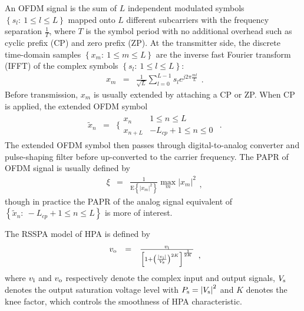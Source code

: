 \documentclass[conference]{IEEEtran}
\begin{document}
An OFDM signal is the sum of $L$ independent modulated symbols
$\left\{s_{l}:\ 1\leq l\leq L\right\}$ mapped onto $L$ different
subcarriers with the frequency separation $\frac{1}{T}$, where $T$
is the symbol period with no additional overhead such as cyclic
prefix (CP) and zero prefix (ZP). At the transmitter side, the
discrete time-domain samples $\left\{x_{m}:\ 1\leq m\leq
L\right\}$ are the inverse fast Fourier transform (IFFT) of the
complex symbols $\left\{s_{l}:\ 1\leq l\leq L\right\}$:
\begin{equation}
\begin{array}{lcl}
x_{m}&=&\frac{1}{\sqrt{L}}\sum\limits_{l=0}^{L-1}s_{l}e^{j2\pi\frac{ml}{L}}
\end{array}.\label{OFDM}
\end{equation}
\noindent Before transmission, $x_{m}$ is usually extended by
attaching a CP or ZP. When CP is applied, the extended OFDM symbol
\begin{equation}
\begin{array}{rcl}
\tilde{x}_{n}&=&\Bigg\{ \begin{array}{ll}x_{n}&1\leq n\leq L\\
x_{n+L}&-L_{cp}+1\leq n\leq 0 \end{array}
\end{array}.
\end{equation}
\noindent The extended OFDM symbol then passes through
digital-to-analog converter and pulse-shaping filter before
up-converted to the carrier frequency. The PAPR of OFDM signal is
usually defined by
\begin{equation}
\begin{array}{rcl}
\xi&=&\frac{1 }{\mbox{E}\left\{\left|x_{m}\right|^2\right\}
}\max\limits_{m} \left|x_{m}\right|^{2}
\end{array},
\end{equation}
\noindent though in practice the PAPR of the analog signal
equivalent of $\left\{\tilde{x}_{n}:\ -L_{cp}+1\leq n\leq
L\right\}$ is more of interest.

The RSSPA model of HPA is defined by
\begin{equation}
\begin{array}{rcl}
v_{\rm o}&=&\frac{v_{\rm i}}{\left[1+\left(\frac{|v_{\rm
i}|}{V_{\rm s}}\right)^{2K}\right]^{\frac{1}{2K}}}
\end{array},\label{RSSPA}
\end{equation}
\noindent where $v_{\rm i}$ and $v_{\rm o}$ respectively denote
the complex input and output signals, $V_{\rm s}$ denotes the
output saturation voltage level with $P_{\rm s}=\left|V_{\rm
s}\right|^2$ and $K$ denotes the knee factor, which controls the
smoothness of HPA characteristic.
\end{document}
